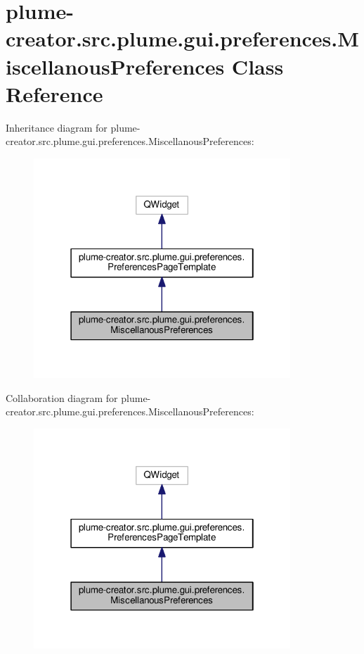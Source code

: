 \hypertarget{classplume-creator_1_1src_1_1plume_1_1gui_1_1preferences_1_1_miscellanous_preferences}{}\section{plume-\/creator.src.\+plume.\+gui.\+preferences.\+Miscellanous\+Preferences Class Reference}
\label{classplume-creator_1_1src_1_1plume_1_1gui_1_1preferences_1_1_miscellanous_preferences}


Inheritance diagram for plume-\/creator.src.\+plume.\+gui.\+preferences.\+Miscellanous\+Preferences\+:\nopagebreak
\begin{figure}[H]
\begin{center}
\leavevmode
\includegraphics[width=274pt]{classplume-creator_1_1src_1_1plume_1_1gui_1_1preferences_1_1_miscellanous_preferences__inherit__graph}
\end{center}
\end{figure}


Collaboration diagram for plume-\/creator.src.\+plume.\+gui.\+preferences.\+Miscellanous\+Preferences\+:\nopagebreak
\begin{figure}[H]
\begin{center}
\leavevmode
\includegraphics[width=274pt]{classplume-creator_1_1src_1_1plume_1_1gui_1_1preferences_1_1_miscellanous_preferences__coll__graph}
\end{center}
\end{figure}

